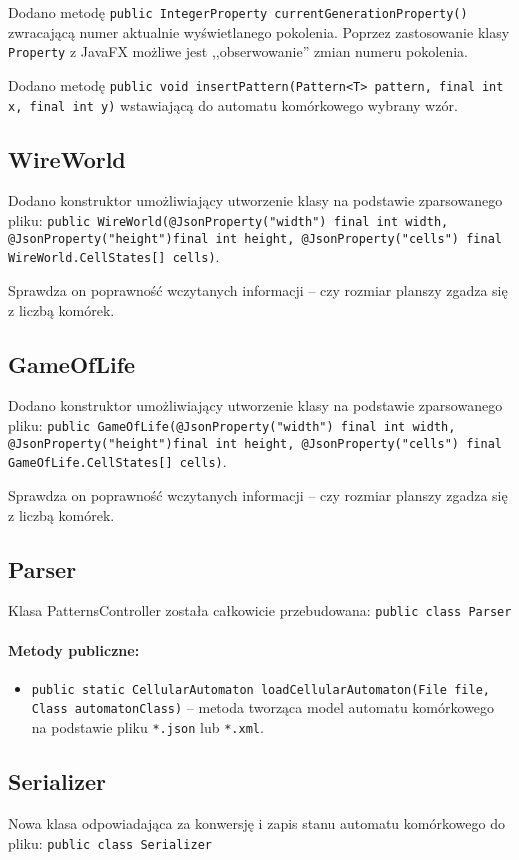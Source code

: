 \documentclass{mwart}
\begin{document}
Dodano metodę \texttt{public IntegerProperty currentGenerationProperty()} zwracającą numer aktualnie wyświetlanego pokolenia. Poprzez zastosowanie klasy \texttt{Property} z JavaFX możliwe jest ,,obserwowanie'' zmian numeru pokolenia.

Dodano metodę \texttt{public void insertPattern(Pattern<T> pattern, final int x, final int y)} wstawiającą do automatu komórkowego wybrany wzór.

\subsection{WireWorld}
Dodano konstruktor umożliwiający utworzenie klasy na podstawie zparsowanego pliku: \texttt{public WireWorld(@JsonProperty("width") final int  width, @JsonProperty("height")final int height, @JsonProperty("cells") final WireWorld.CellStates[] cells)}.

Sprawdza on poprawność wczytanych informacji -- czy rozmiar planszy zgadza się z liczbą komórek.

\subsection{GameOfLife}
Dodano konstruktor umożliwiający utworzenie klasy na podstawie zparsowanego pliku: \texttt{public GameOfLife(@JsonProperty("width") final int  width, @JsonProperty("height")final int height, @JsonProperty("cells") final GameOfLife.CellStates[] cells)}.

Sprawdza on poprawność wczytanych informacji -- czy rozmiar planszy zgadza się z liczbą komórek.

\subsection{Parser}
Klasa PatternsController została całkowicie przebudowana:
\texttt{public class Parser}

\paragraph{Metody publiczne:}
\begin{itemize}
	\item \texttt{public static CellularAutomaton loadCellularAutomaton(File file, Class automatonClass)} -- metoda tworząca model automatu komórkowego na podstawie pliku \texttt{*.json} lub \texttt{*.xml}.
\end{itemize}

\subsection{Serializer}
Nowa klasa odpowiadająca za konwersję i zapis stanu automatu komórkowego do pliku:
\texttt{public class Serializer}
\end{document}
